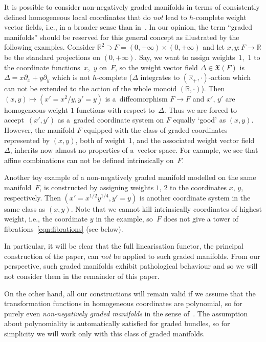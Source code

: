 \documentclass[10pt,a4paper]{amsart}
\newcommand{\ra}{\rightarrow}
\newcommand{\R}{{\mathbb R}}
\newcommand{\pa}{\partial}
\numberwithin{equation}{section}
\begin{document}
\begin{Remark}
It is possible to consider non-negatively graded manifolds in terms of consistently def\/ined homogeneous local coordinates that do \emph{not} lead to $h$-complete weight vector f\/ields, i.e., in a broader sense than in~\cite{Voronov:2001qf}. In our opinion, the term ``graded manifolds'' should be reserved for this general concept as illustrated by the following examples. Consider $\R^2\supset F = (0, +\infty)\times (0, +\infty)$ and let $x, y\colon  F\rightarrow \R$ be the standard projections on $(0, +\infty)$. Say, we want to assign weights~$1$,~$1$ to the coordinate functions~$x$,~$y$ on~$F$, so the weight vector f\/ield $\Delta \in \mathfrak{X}(F)$ is $\Delta= x \pa_x + y \pa_y$ which is not $h$-complete ($\Delta$ integrates to $(\R_+, \cdot)$-action which can not be extended to the action of the whole monoid $(\R, \cdot)$). Then $(x, y)\mapsto (x' = x^2/y, y'=y)$ is a~dif\/feomorphism $F\ra F$ and $x'$, $y'$ are homogeneous weight $1$ functions with respect to~$\Delta$. Thus we are forced to accept~$(x', y')$ as a~graded coordinate system on $F$ equally `good' as $(x, y)$. However, the manifold $F$ equipped with the class of graded coordinates represented by $(x, y)$, both of weight~1, and the associated weight vector f\/ield~$\Delta$, inherits now almost no properties of a~vector space. For example, we see that af\/f\/ine combinations can not be def\/ined intrinsically on~$F$.

Another toy example of a non-negatively graded manifold modelled on the same mani\-fold~$F$, is constructed by assigning weights $1$, $2$ to the coordinates $x$, $y$, respectively. Then $(x'=x^{1/2} y^{1/4}, y'=y)$ is another coordinate system in the same class as $(x, y)$. Note that we cannot kill intrinsically coordinates of highest weight, i.e., the coordinate $y$ in the example, so~$F$ does not give a tower of f\/ibrations~\eqref{eqn:fibrations} (see below).

In particular, it will be clear that the full linearisation functor, the principal construction of the paper, can \emph{not} be applied to such graded manifolds. From our perspective, such graded manifolds exhibit pathological behaviour and so we will not consider them in the remainder of this paper.

On the other hand, all our constructions will remain valid if we assume that the transformation functions in homogeneous coordinates are polynomial, so for purely even \emph{non-negatively graded manifolds} in the sense of~\cite{Voronov:2001qf}. The assumption about polynomiality is automatically sa\-tis\-f\/ied for graded bundles, so for simplicity we will work only with this class of graded manifolds.
\end{Remark}
\end{document}
